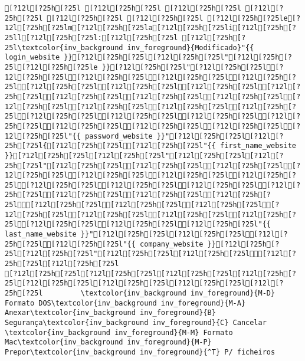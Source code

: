 \documentclass{scrartcl}
\begin{document}
\begin{Verbatim}
[?12l[?25h[?25l [?12l[?25h[?25l [?12l[?25h[?25l [?12l[?25h[?25l [?12l[?25h[?25l [?12l[?25h[?25l [?12l[?25h[?25le[?12l[?25h[?25lm[?12l[?25h[?25la[?12l[?25h[?25li[?12l[?25h[?25ll[?12l[?25h[?25l:[?12l[?25h[?25l [?12l[?25h[?25l\textcolor{inv_background inv_foreground}{Modificado}"{{ login_website }}[?12l[?25h[?25l[?12l[?25h[?25l"[?12l[?25h[?25l[?12l[?25h[?25le }}[?12l[?25h[?25l"[?12l[?25h[?25l[?12l[?25h[?25l[?12l[?25h[?25l[?12l[?25h[?25l[?12l[?25h[?25l[?12l[?25h[?25l[?12l[?25h[?25l[?12l[?25h[?25l[?12l[?25h[?25l[?12l[?25h[?25l[?12l[?25h[?25l[?12l[?25h[?25l[?12l[?25h[?25l[?12l[?25h[?25l[?12l[?25h[?25l[?12l[?25h[?25l[?12l[?25h[?25l[?12l[?25h[?25l[?12l[?25h[?25l[?12l[?25h[?25l[?12l[?25h[?25l[?12l[?25h[?25l[?12l[?25h[?25l[?12l[?25h[?25l"{{ password_website }}"[?12l[?25h[?25l[?12l[?25h[?25l{[?12l[?25h[?25l[?12l[?25h[?25l"{{ first_name_website }}[?12l[?25h[?25l[?12l[?25h[?25l"[?12l[?25h[?25l[?12l[?25h[?25l"[?12l[?25h[?25l[?12l[?25h[?25l[?12l[?25h[?25l[?12l[?25h[?25l[?12l[?25h[?25l[?12l[?25h[?25l[?12l[?25h[?25l[?12l[?25h[?25l[?12l[?25h[?25l[?12l[?25h[?25l[?12l[?25h[?25l[?12l[?25h[?25l[?12l[?25h[?25l[?12l[?25h[?25l[?12l[?25h[?25l[?12l[?25h[?25l[?12l[?25h[?25l[?12l[?25h[?25l[?12l[?25h[?25l[?12l[?25h[?25l[?12l[?25h[?25l[?12l[?25h[?25l[?12l[?25h[?25l[?12l[?25h[?25l"{{ last_name_website }}"[?12l[?25h[?25l[?12l[?25h[?25l[?12l[?25h[?25l[?12l[?25h[?25l"{{ company_website }}[?12l[?25h[?25l[?12l[?25h[?25l"[?12l[?25h[?25l[?12l[?25h[?25l[?12l[?25h[?25l[?12l[?25h[?25l
[?12l[?25h[?25l[?12l[?25h[?25l[?12l[?25h[?25l[?12l[?25h[?25l[?12l[?25h[?25l[?12l[?25h[?25l[?12l[?25h[?25l[?12l[?25h[?25l         \textcolor{inv_background inv_foreground}{M-D} Formato DOS\textcolor{inv_background inv_foreground}{M-A} Anexar\textcolor{inv_background inv_foreground}{B} Segurança\textcolor{inv_background inv_foreground}{C} Cancelar           \textcolor{inv_background inv_foreground}{M-M} Formato Mac\textcolor{inv_background inv_foreground}{M-P} Prepor\textcolor{inv_background inv_foreground}{^T} P/ ficheiros

\end{Verbatim}
\end{document}
